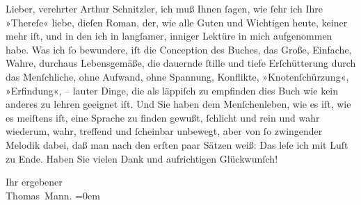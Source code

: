 \pstart{}Lieber, verehrter Arthur Schnitzler,\pend\vspace{0.5em}
\pstart
           ich muß Ihnen{ }ſagen, wie{ }ſehr ich Ihre »Thereſe«
               liebe, dieſen Roman, der, wie alle Guten und Wichtigen heute, keiner mehr iſt, und in
               den ich in langſamer, inniger Lektüre in mich aufgenommen habe. Was ich{ }ſo bewundere,
               iſt die Conception des Buches, das Große, Einfache, Wahre, durchaus Lebensgemäße, die
               dauernde{ }ſtille und tiefe Erſchütterung durch das {\pb}Menſchliche, ohne Aufwand, ohne Spannung,
               Konflikte, »Knotenſchürzung«, »Erfindung«, – lauter Dinge, die als läppiſch zu
               empfinden dies Buch wie kein
               anderes zu lehren geeignet iſt. Und Sie haben dem Menſchenleben, wie es iſt, wie es
               meiſtens iſt, eine Sprache zu finden gewußt,{ }ſchlicht und rein und wahr wiederum,
               wahr, treffend und{ }ſcheinbar unbewegt, aber von{ }ſo zwingender Melodik dabei, daß man
               nach den erſten paar Sätzen weiß: Das leſe ich mit Luſt zu Ende. Haben Sie vielen
               Dank und aufrichtigen Glückwunſch!\pend
           
\pstart
           Ihr ergebener{\\[\baselineskip]}\spacefill\mbox{Thomas Mann.}\pend
           \leftskip=0em{}\endnumbering{}  \newcommand{\dateiname}{L02501}\newcommand{\titel}{Thomas Mann an Arthur Schnitzler, 28. 5. 1928}\newcommand{\editorInnen}{Martin Anton Müller und Gerd-Hermann Susen}

